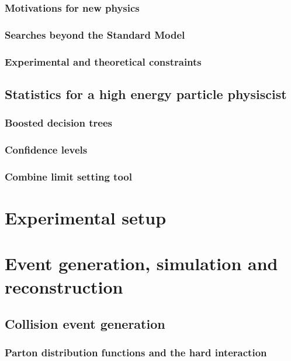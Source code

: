 \subsection{Motivations for new physics}
\subsection{Searches beyond the Standard Model}
\subsection{Experimental and theoretical constraints}
\section{Statistics for a high energy particle physiscist}
\subsection{Boosted decision trees}
\subsection{Confidence levels }
\subsection{Combine limit setting tool}

\chapter{Experimental setup}



\chapter{Event generation, simulation and reconstruction}
\section{Collision event generation}
\subsection{Parton distribution functions and the hard interaction}
